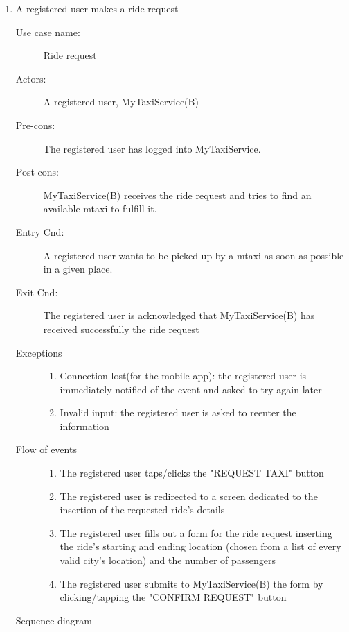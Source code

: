 \documentclass[11pt,titlepage]{article} %
\begin{document}
	\begin{enumerate}
	      \item A registered user makes a ride request
		\begin{description}
		        \item [Use case name:] Ride request
		        \item [Actors:] A registered user, MyTaxiService(B)
		        \item [Pre-cons:] The registered user has logged into MyTaxiService.
		        \item [Post-cons:] MyTaxiService(B) receives the ride request and tries to find an available mtaxi to fulfill it.
		        \item [Entry Cnd:] A registered user wants to be picked up by a mtaxi as soon as possible in a given place.
		        \item [Exit Cnd:] The registered user is acknowledged that MyTaxiService(B) has received successfully the ride
		        request
		        \item [Exceptions]\hfill
			\begin{enumerate}
			          \item Connection lost(for the mobile app): the registered user is immediately notified of the event and
			          asked to try again later
			          \item Invalid input: the registered user is asked to reenter the information
			\end{enumerate}
		        \item [Flow of events]\hfill
			\begin{enumerate}
			          \item The registered user taps/clicks the "REQUEST TAXI" button
			          \item The registered user is redirected to a screen dedicated to the insertion
			          of the requested ride's details
			          \item The registered user fills out a form for the ride request inserting the ride's starting and ending location
			          (chosen from a list of every valid city's location) and the number of passengers
			          \item The registered user submits to MyTaxiService(B) the form by clicking/tapping the "CONFIRM REQUEST" button
			\end{enumerate}
		\end{description}
		\newpage
		Sequence diagram
		\begin{center}

\end{center}
\end{enumerate}
\end{document}
